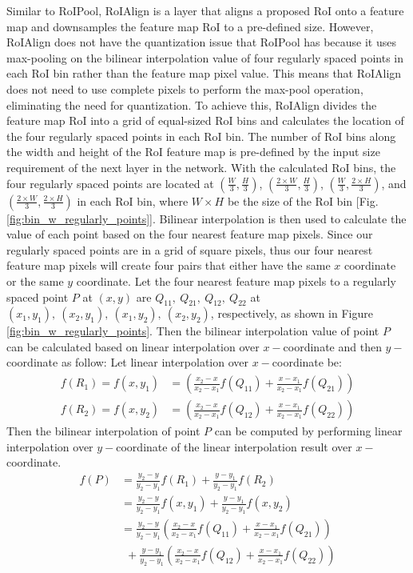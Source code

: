 Similar to RoIPool, RoIAlign is a layer that aligns a proposed RoI onto a feature map and downsamples the feature map RoI to a pre-defined size. However, RoIAlign does not have the quantization issue that RoIPool has because it uses max-pooling on the bilinear interpolation value of four regularly spaced points in each RoI bin rather than the feature map pixel value. This means that RoIAlign does not need to use complete pixels to perform the max-pool operation, eliminating the need for quantization. To achieve this, RoIAlign divides the feature map RoI into a grid of equal-sized RoI bins and calculates the location of the four regularly spaced points in each RoI bin. The number of RoI bins along the width and height of the RoI feature map is pre-defined by the input size requirement of the next layer in the network. With the calculated RoI bins, the four regularly spaced points are located at $(\frac{W}{3}, \frac{H}{3})$, $(\frac{2 \times W}{3}, \frac{H}{3})$, $(\frac{W}{3}, \frac{2 \times H}{3})$, and $(\frac{2 \times W}{3}, \frac{2 \times H}{3})$ in each RoI bin, where $W \times H$ be the size of the RoI bin [Fig. \ref{fig:bin_w_regularly_points}]. Bilinear interpolation is then used to calculate the value of each point based on the four nearest feature map pixels. {\color{red} Since our regularly spaced points are in a grid of square pixels, thus our four nearest feature map pixels will create four pairs that either have the same $x$ coordinate or the same $y$ coordinate}. Let the four nearest feature map pixels to a regularly spaced point $P$ at $(x, y)$ are $Q_{11},\ Q_{21},\ Q_{12},\ Q_{22}$ at $(x_1, y_1),\ (x_2, y_1),\ (x_1, y_2),\ (x_2, y_2)$, respectively, as shown in Figure \ref{fig:bin_w_regularly_points}. Then the bilinear interpolation value of point $P$ can be calculated based on linear interpolation over $x-$coordinate and then $y-$coordinate as follow:
\relax
{}\relax
\noindent Let linear interpolation over $x-$coordinate be:
\begin{align*}
    f(R_1) = f(x, y_1) &= \left( \frac{x_2-x}{x_2-x_1}f(Q_{11}) + \frac{x-x_1}{x_2-x_1}f(Q_{21}) \right) \\
    f(R_2) = f(x, y_2) &= \left( \frac{x_2-x}{x_2-x_1}f(Q_{12}) + \frac{x-x_1}{x_2-x_1}f(Q_{22}) \right)
\end{align*}
\noindent Then the bilinear interpolation of point $P$ can be computed by performing linear interpolation over $y-$coordinate of the linear interpolation result over $x-$coordinate. 
\begin{align}
    f(P) &= \frac{y_2-y}{y_2-y_1} f(R_1) + \frac{y-y_1}{y_2-y_1} f(R_2) \nonumber \\
    &= \frac{y_2-y}{y_2-y_1} f(x, y_1) + \frac{y-y_1}{y_2-y_1} f(x, y_2) \nonumber \\
    &= \frac{y_2-y}{y_2-y_1} \left( \frac{x_2-x}{x_2-x_1}f(Q_{11}) + \frac{x-x_1}{x_2-x_1}f(Q_{21}) \right) \nonumber \\
    &\ \ + \frac{y-y_1}{y_2-y_1} \left( \frac{x_2-x}{x_2-x_1}f(Q_{12}) + \frac{x-x_1}{x_2-x_1}f(Q_{22}) \right) \label{eq:binlinear_interpolation}
\end{align}

